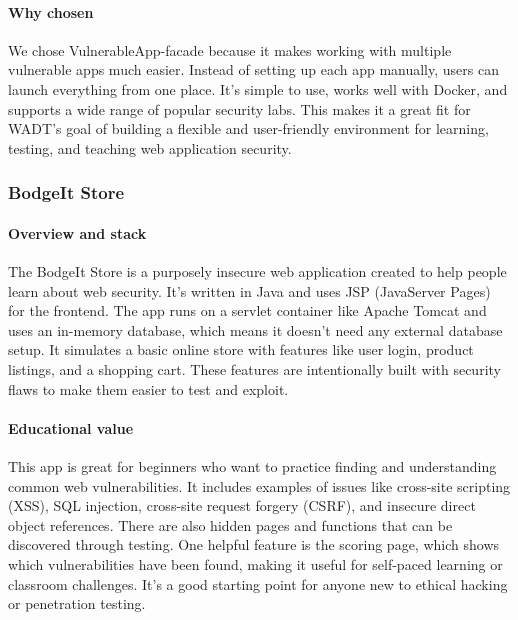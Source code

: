 \documentclass[12pt]{article}
\begin{document}
\paragraph{Why chosen}
We chose VulnerableApp-facade because it makes working with multiple vulnerable apps much easier. Instead of setting up each app manually, users can launch everything from one place. It’s simple to use, works well with Docker, and supports a wide range of popular security labs. This makes it a great fit for WADT’s goal of building a flexible and user-friendly environment for learning, testing, and teaching web application security.

\subsubsection{BodgeIt Store}

\paragraph{Overview and stack}
The BodgeIt Store is a purposely insecure web application created to help people learn about web security. It’s written in Java and uses JSP (JavaServer Pages) for the frontend. The app runs on a servlet container like Apache Tomcat and uses an in-memory database, which means it doesn’t need any external database setup. It simulates a basic online store with features like user login, product listings, and a shopping cart. These features are intentionally built with security flaws to make them easier to test and exploit.

\paragraph{Educational value}
This app is great for beginners who want to practice finding and understanding common web vulnerabilities. It includes examples of issues like cross-site scripting (XSS), SQL injection, cross-site request forgery (CSRF), and insecure direct object references. There are also hidden pages and functions that can be discovered through testing. One helpful feature is the scoring page, which shows which vulnerabilities have been found, making it useful for self-paced learning or classroom challenges. It’s a good starting point for anyone new to ethical hacking or penetration testing.
\end{document}
